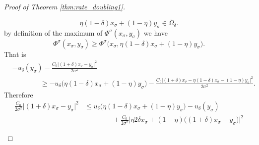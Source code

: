 \documentclass[11pt,reqno]{amsart}
\numberwithin{figure}{section}
\theoremstyle{plain}
\theoremstyle{remark}
\numberwithin{equation}{section}
\begin{document}
\begin{proof}[Proof of Theorem \ref{thm:rate_doubling1}]
\begin{enumerate}
\begin{equation*}
    \eta (1-\delta)x_\sigma + (1-\eta)y_\sigma \in \overline{\Omega}_{\delta}.
\end{equation*}
by definition of the maximum of $\Phi^\sigma(x_\sigma,y_\sigma)$ we have
\begin{equation*}
    \Phi^\sigma(x_\sigma,y_\sigma) \geq \Phi^\sigma\Big(x_\sigma, \eta (1-\delta)x_\sigma + (1-\eta)y_\sigma \Big).
\end{equation*}
That is
\begin{align*}
    &- u_\delta(y_\sigma) - \frac{C_0\big|(1+\delta)x_\sigma - y_\sigma \big|^2}{2\sigma^2} \\
    &\qquad\qquad\geq  - u_\delta\Big(\eta (1-\delta)x_\sigma + (1-\eta)y_\sigma\Big) - \frac{C_0\big|(1+\delta)x_\sigma - \eta (1-\delta)x_\sigma - (1-\eta)y_\sigma \big|^2}{2\sigma^2}.
\end{align*}
Therefore
\begin{align*}
    \frac{C_0}{2\sigma^2}\big|(1+\delta)x_\sigma - y_\sigma \big|^2 &\leq u_\delta\Big(\eta (1-\delta)x_\sigma + (1-\eta)y_\sigma\Big) - u_\delta(y_\sigma) \\
    &\qquad\qquad  + \frac{C_0}{2\sigma^2}\Big|\eta2\delta x_\sigma + (1-\eta)\big((1+\delta)x_\sigma-y_\sigma\big)\Big|^2
\end{align*}



\end{enumerate}
\end{proof}
\end{document}
